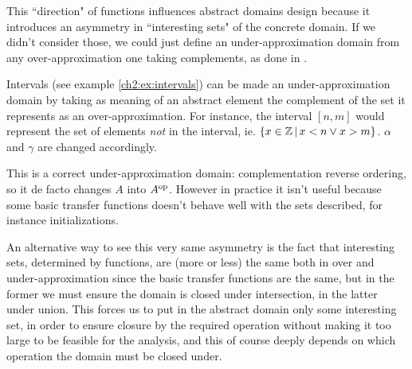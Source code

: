 This ``direction" of functions influences abstract domains design because it introduces an asymmetry in ``interesting sets" of the concrete domain.
If we didn't consider those, we could just define an under-approximation domain from any over-approximation one taking complements, as done in \cite{lev-backward-analysis-complement}.
\begin{example}
	Intervals (see example \ref{ch2:ex:intervals}) can be made an under-approximation domain by taking as meaning of an abstract element the complement of the set it represents as an over-approximation.
	For instance, the interval $[n, m]$ would represent the set of elements \textit{not} in the interval, ie. $\{ x \in \mathbb{Z} \,\vert\, x < n \lor x > m \}$.
	$\alpha$ and $\gamma$ are changed accordingly.

	This is a correct under-approximation domain: complementation reverse ordering, so it de facto changes $A$ into $A^{\text{op}}$. However in practice it isn't useful because some basic transfer functions doesn't behave well with the sets described, for instance initializations.
\end{example}

An alternative way to see this very same asymmetry is the fact that interesting sets, determined by functions, are (more or less) the same both in over and under-approximation since the basic transfer functions are the same, but in the former we must ensure the domain is closed under intersection, in the latter under union. This forces us to put in the abstract domain only some interesting set, in order to ensure closure by the required operation without making it too large to be feasible for the analysis, and this of course deeply depends on which operation the domain must be closed under.

